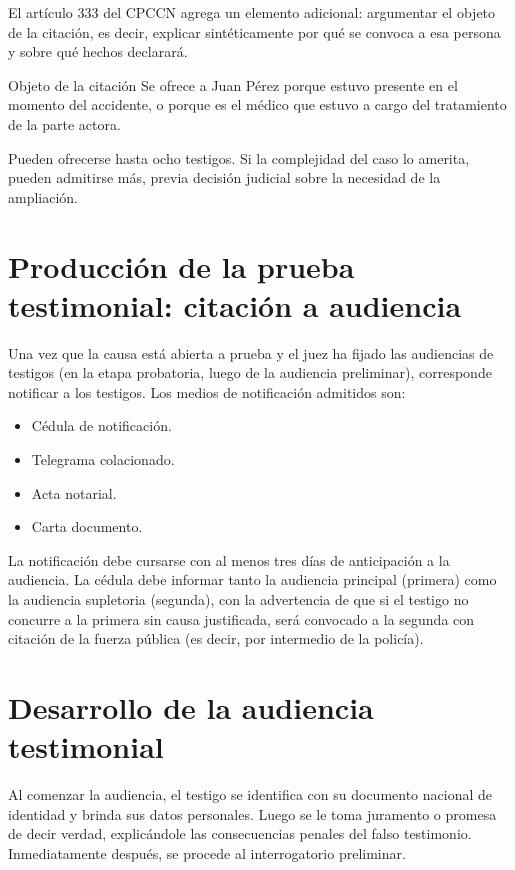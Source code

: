 \documentclass[12pt,oneside]{book}
\begin{document}
El artículo 333 del CPCCN agrega un elemento adicional: argumentar el objeto de la citación, es decir, explicar sintéticamente por qué se convoca a esa persona y sobre qué hechos declarará.

\begin{example}{Objeto de la citación}
Se ofrece a Juan Pérez porque estuvo presente en el momento del accidente, o porque es el médico que estuvo a cargo del tratamiento de la parte actora.
\end{example}

Pueden ofrecerse hasta ocho testigos. Si la complejidad del caso lo amerita, pueden admitirse más, previa decisión judicial sobre la necesidad de la ampliación.

\section{Producción de la prueba testimonial: citación a audiencia}

Una vez que la causa está abierta a prueba y el juez ha fijado las audiencias de testigos (en la etapa probatoria, luego de la audiencia preliminar), corresponde notificar a los testigos. Los medios de notificación admitidos son:

\begin{itemize}
    \item Cédula de notificación.
    \item Telegrama colacionado.
    \item Acta notarial.
    \item Carta documento.
\end{itemize}

La notificación debe cursarse con al menos tres días de anticipación a la audiencia. La cédula debe informar tanto la audiencia principal (primera) como la audiencia supletoria (segunda), con la advertencia de que si el testigo no concurre a la primera sin causa justificada, será convocado a la segunda con citación de la fuerza pública (es decir, por intermedio de la policía).

\section{Desarrollo de la audiencia testimonial}

Al comenzar la audiencia, el testigo se identifica con su documento nacional de identidad y brinda sus datos personales. Luego se le toma juramento o promesa de decir verdad, explicándole las consecuencias penales del falso testimonio. Inmediatamente después, se procede al interrogatorio preliminar.
\end{document}
